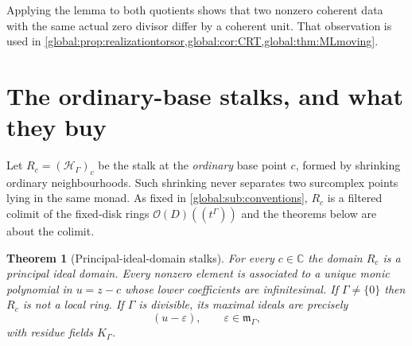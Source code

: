 \documentclass[11pt,letterpaper]{article}
\newtheorem{theorem}{Theorem}[section]
\theoremstyle{definition}
\theoremstyle{remark}
\newcommand{\C}{\mathbb C}
\newcommand{\OO}{\mathcal O}
\newcommand{\HH}{\mathscr H_\Gamma}
\newcommand{\KK}{K_\Gamma}
\newcommand{\mK}{\mathfrak m_\Gamma}
\numberwithin{equation}{section}
\begin{document}
Applying the lemma to both quotients shows that two nonzero coherent data with the same actual zero divisor differ by a coherent unit. That observation is used in \cref{global:prop:realizationtorsor,global:cor:CRT,global:thm:MLmoving}.

\section{The ordinary-base stalks, and what they buy}\label{global:sec:stalks}

Let $R_c=(\HH)_c$ be the stalk at the \emph{ordinary} base point $c$, formed by shrinking ordinary neighbourhoods. Such shrinking never separates two surcomplex points lying in the same monad. As fixed in \cref{global:sub:conventions}, $R_c$ is a filtered colimit of the fixed-disk rings $\OO(D)((t^\Gamma))$ and the theorems below are about the colimit.

\begin{theorem}[Principal-ideal-domain stalks]\label{global:thm:PID}
For every $c\in\C$ the domain $R_c$ is a principal ideal domain. Every nonzero element is associated to a unique monic polynomial in $u=z-c$ whose lower coefficients are infinitesimal. If $\Gamma\ne\{0\}$ then $R_c$ is \emph{not} a local ring. If $\Gamma$ is divisible, its maximal ideals are precisely
\begin{equation}\label{global:eq:maxideals}
  (u-\varepsilon),\qquad \varepsilon\in\mK,
\end{equation}
with residue fields $\KK$.
\end{theorem}
\end{document}
